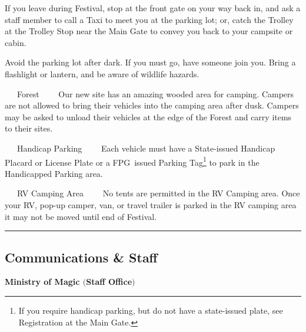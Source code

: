 \documentclass[9pt,twoside,openright,final,article]{memoir}
\def\fpg{{\beltanefamily FPG\ }}
\renewcommand{\pfbreakdisplay}{%
  \needspace{24pt}%
  \vspace{8pt}\\\ding{76}\quad\ding{77}\quad\ding{78}\\%
  \vspace{11pt}}
\let\oldsection=\section
\renewcommand{\section}[1]{%
  \vspace{3pt}%
  \needspace{1in}%
  { \hrule } \nopagebreak %
  \begin{center}\oldsection{#1}\end{center}\nopagebreak{}}
\renewcommand{\subsection}[1]{%
  \vspace{6pt}%
  \needspace{1.25in}%
  \begin{center}\textbf{\Large \beltanefamily #1}\end{center}

  \nopagebreak}
\renewcommand{\subsubsection}[1]{%
  \vspace{1pt}\needspace{1.5in}
  {\large ~~~\beltanefamily #1~~~\ }
  \nopagebreak}
\begin{document}
\begin{multicols}{2}
  If you leave during Festival, stop at the front gate on your way
  back in, and ask a staff member to call a Taxi to meet you at the
  parking lot; or, catch the Trolley at the Trolley Stop near the Main
  Gate to convey you back to your campsite or cabin.

  Avoid the parking lot after dark. If you must go, have someone join
  you. Bring a flashlight or lantern, and be aware of wildlife
  hazards.

  \subsubsection{Forest} Our new site has an amazing wooded area for
  camping. Campers are not allowed to bring their vehicles into the
  camping area after dusk. Campers may be asked to unload their
  vehicles at the edge of the Forest and carry items to their sites.

  \subsubsection{Handicap Parking} Each vehicle must have a
  State-issued Handicap Placard or License Plate or a \fpg issued
  Parking Tag\footnote{If you require handicap parking, but do not
    have a state-issued plate, see Registration at the Main Gate.} to
  park in the Handicapped Parking area.


  \subsubsection{RV Camping Area} No tents are permitted in the RV
  Camping area. Once your RV, pop-up camper, van, or travel trailer is
  parked in the RV camping area it may not be moved until end of
  Festival.



  \section{Communications \& Staff}





  \subsection{Ministry of Magic {\small $($Staff Office$)$}}


\end{multicols}
\end{document}
